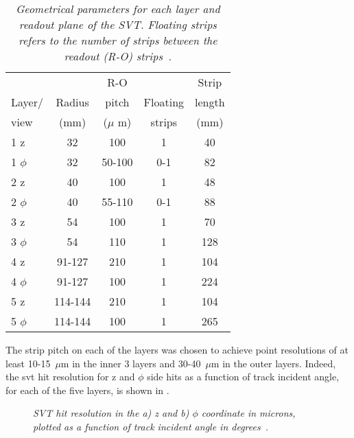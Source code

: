 \begin{table}
  \begin{center}
    \begin{tabular}{lcccc}
      \hline\hline
                    &          &    R-O     &             &  Strip  \\
      Layer/  &  Radius  &   pitch    &  Floating   &  length \\
      view    &   (mm)   &  ($\mu$ m) &  strips     &  (mm)   \\ 
      \hline
      1 z         &          32  &       100  &     1  &   40  \\
      1 $\phi$    &          32  &    50-100  &   0-1  &   82  \\
      2 z         &          40  &       100  &     1  &   48  \\
      2 $\phi$    &          40  &    55-110  &   0-1  &   88  \\
      3 z         &          54  &       100  &     1  &   70  \\
      3 $\phi$    &          54  &       110  &     1  &  128  \\
      4 z         &      91-127  &       210  &     1  &  104  \\
      4 $\phi$    &      91-127  &       100  &     1  &  224  \\
      5 z         &     114-144  &       210  &     1  &  104  \\
      5 $\phi$    &     114-144  &       100  &     1  &  265  \\
      \hline\hline
    \end{tabular}
    \caption{\it Geometrical parameters for each layer and readout plane of the
      SVT. Floating strips refers to the number of strips between the readout
      (R-O) strips~\cite{babar_status_2001}.}\label{babar_b}
  \end{center}
\end{table}
The strip pitch on each of the layers was chosen to achieve point resolutions of
at least 10-15~$\mu$m in the inner 3 layers and 30-40~$\mu$m in the outer
layers. Indeed, the \gls{svt} hit resolution for z and $\phi$ side hits as a
function of track incident angle, for
each of the five layers, is shown in .\\
\begin{figure}[!htbp]
  \centering {} 
  \caption{\textit{SVT hit resolution in the a) z and b) $\phi$ coordinate in
      microns, plotted as a function of track incident angle in
      degrees~\cite{babar_status_2001}.}}\label{babar_resolution}
\end{figure}

